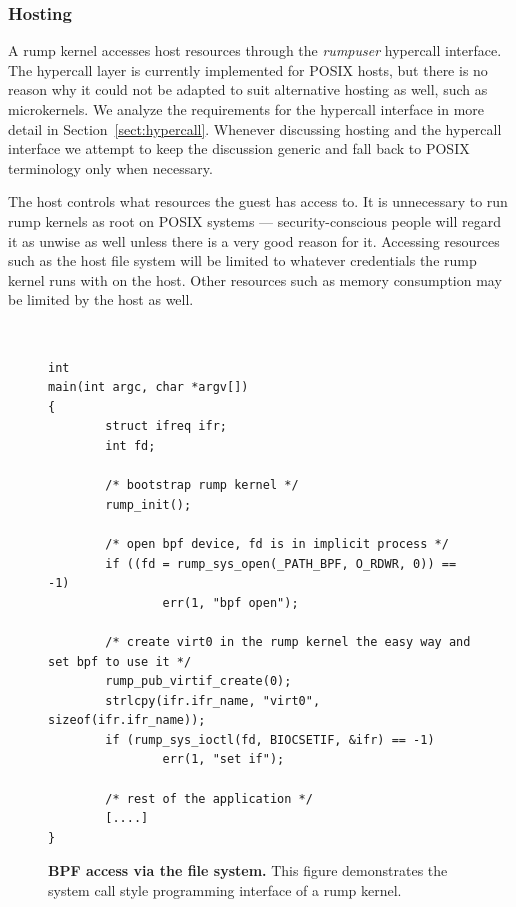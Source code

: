 \subsubsection{Hosting}

A rump kernel accesses host resources through the \textit{rumpuser} hypercall interface.
The hypercall layer is currently implemented for POSIX hosts, but there
is no reason why it could not be adapted to suit alternative hosting
as well, such as microkernels.  We analyze the requirements for the
hypercall interface in more detail in Section~\ref{sect:hypercall}.
Whenever discussing hosting and the hypercall interface we attempt to
keep the discussion generic and fall back to POSIX terminology only
when necessary.

The host controls what resources the guest has access to.
It is unnecessary to run rump kernels as root on POSIX systems ---
security-conscious people will regard it as unwise as well unless there
is a very good reason for it.  Accessing resources such as the host file
system will be limited to whatever credentials the rump kernel runs with
on the host.  Other resources such as memory consumption may be limited
by the host as well.

\begin{figure}
{\tt \scriptsize
\begin{verbatim}
int
main(int argc, char *argv[])
{
        struct ifreq ifr;
        int fd;

        /* bootstrap rump kernel */
        rump_init();

        /* open bpf device, fd is in implicit process */
        if ((fd = rump_sys_open(_PATH_BPF, O_RDWR, 0)) == -1)
                err(1, "bpf open");

        /* create virt0 in the rump kernel the easy way and set bpf to use it */
        rump_pub_virtif_create(0);
        strlcpy(ifr.ifr_name, "virt0", sizeof(ifr.ifr_name));
        if (rump_sys_ioctl(fd, BIOCSETIF, &ifr) == -1)
                err(1, "set if");

        /* rest of the application */
        [....]
}
\end{verbatim}}
\caption[BPF access via file system]{\textbf{BPF access via the file
system.} This figure demonstrates the system call style programming interface
of a rump kernel.}
\label{fig:bpfvfs}
\end{figure}

